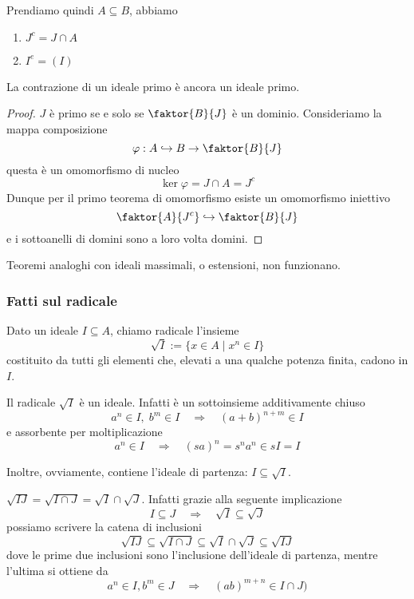 \begin{multicols}{2}
Prendiamo quindi $ A \subseteq B $, abbiamo
\begin{enumerate}
	\item $ J^c = J \cap A $
	\item $ I^e = (I) $
\end{enumerate}

\begin{prop}\label{contr}
	La contrazione di un ideale primo è ancora un ideale primo.
\end{prop}
\begin{proof}
	$ J $ è primo se e solo se $ \faktor{B}{J} $ è un dominio. Consideriamo la mappa composizione 
	\[ \varphi : A \hookrightarrow B \to \faktor{B}{J} \]
	questa è un omomorfismo di nucleo
	\[ \ker\varphi = J \cap A = J^c \]
	Dunque per il primo teorema di omomorfismo esiste un omomorfismo iniettivo
	\[ \faktor{A}{J^c} \hookrightarrow \faktor{B}{J} \]
	e i sottoanelli di domini sono a loro volta domini.
\end{proof}

Teoremi analoghi con ideali massimali, o estensioni, non funzionano.

\subsubsection{Fatti sul radicale}
\begin{definition} Dato un ideale $ I \subseteq A $, chiamo radicale l'insieme
	$$  \sqrt{I}:= \{ x \in A \mid x^n \in I \}  $$
	costituito da tutti gli elementi che, elevati a una qualche potenza finita, cadono in $ I $.
\end{definition}

\begin{remark}
Il radicale $ \sqrt{I} $ è un ideale. Infatti è un sottoinsieme additivamente chiuso
\[ a^n \in I,\;  b^m \in I \quad\Rightarrow\quad (a+b)^{n+m} \in I \]
e assorbente per moltiplicazione
\[ a^n \in I \quad\Rightarrow\quad (sa)^{n} = s^na^n \in sI = I \]

Inoltre, ovviamente, contiene l'ideale di partenza: $ I \subseteq \sqrt{I} $.
\end{remark}


\begin{remark}
	$ \sqrt{IJ} = \sqrt{I \cap J} = \sqrt{I} \cap \sqrt{J}  $. Infatti grazie alla seguente implicazione
	\[ I \subseteq J \quad\Rightarrow\quad \sqrt{I} \subseteq \sqrt{J} \]
	possiamo scrivere la catena di inclusioni
	\[ \sqrt{IJ} \subseteq \sqrt{I \cap J} \subseteq \sqrt{I} \cap \sqrt{J} \subseteq \sqrt{IJ} \]
	dove le prime due inclusioni sono l'inclusione dell'ideale di partenza, mentre l'ultima si ottiene da
	\[ a^n \in I, b^m \in J \quad\Rightarrow\quad (ab)^{m + n} \in I \cap J )\]
	

\end{remark}
\end{multicols}
